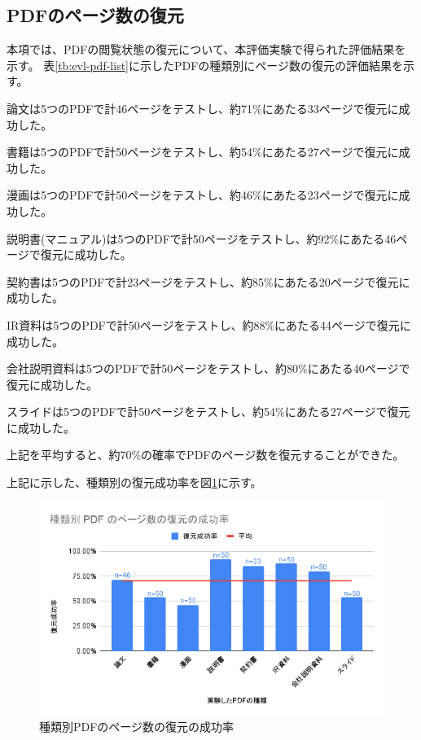 \subsection{PDFのページ数の復元}
本項では、PDFの閲覧状態の復元について、本評価実験で得られた評価結果を示す。
表\ref{tb:evl-pdf-list}に示したPDFの種類別にページ数の復元の評価結果を示す。

論文は5つのPDFで計46ページをテストし、約71\%にあたる33ページで復元に成功した。

書籍は5つのPDFで計50ページをテストし、約54\%にあたる27ページで復元に成功した。

漫画は5つのPDFで計50ページをテストし、約46\%にあたる23ページで復元に成功した。

説明書(マニュアル)は5つのPDFで計50ページをテストし、約92\%にあたる46ページで復元に成功した。

契約書は5つのPDFで計23ページをテストし、約85\%にあたる20ページで復元に成功した。

IR資料は5つのPDFで計50ページをテストし、約88\%にあたる44ページで復元に成功した。

会社説明資料は5つのPDFで計50ページをテストし、約80\%にあたる40ページで復元に成功した。

スライドは5つのPDFで計50ページをテストし、約54\%にあたる27ページで復元に成功した。

上記を平均すると、約70\%の確率でPDFのページ数を復元することができた。

上記に示した、種類別の復元成功率を図\ref{fig:success-rate-pdf}に示す。


\begin{figure}[htbp]
  \label{fig:success-rate-pdf}
  \begin{center}
    \includegraphics[bb=0 0 600 371,width=15cm]{img/060_evaluation/result/pdf/success-rate-pdf.pdf}
  \end{center}
  \caption{種類別PDFのページ数の復元の成功率}
\end{figure}
